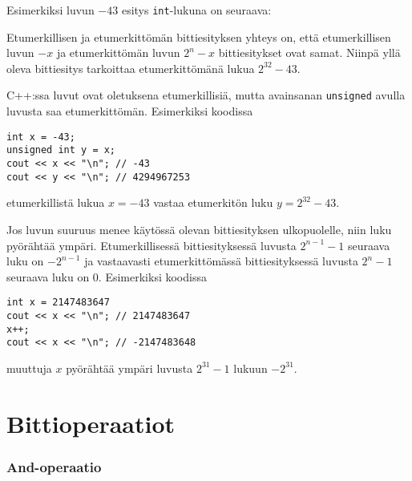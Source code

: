 Esimerkiksi luvun $-43$ esitys \texttt{int}-lukuna on seuraava:

\begin{center}
\end{center}

Etumerkillisen ja etumerkittömän bittiesityksen
yhteys on, että etumerkillisen luvun $-x$
ja etumerkittömän luvun $2^n-x$ bittiesitykset ovat samat.
Niinpä yllä oleva bittiesitys tarkoittaa
etumerkittömänä lukua $2^{32}-43$.

C++:ssa luvut ovat oletuksena etumerkillisiä,
mutta avainsanan \texttt{unsigned} avulla
luvusta saa etumerkittömän.
Esimerkiksi koodissa

\begin{lstlisting}
int x = -43;
unsigned int y = x;
cout << x << "\n"; // -43
cout << y << "\n"; // 4294967253
\end{lstlisting}

etumerkillistä lukua $x=-43$ vastaa etumerkitön luku $y=2^{32}-43$.

Jos luvun suuruus menee käytössä
olevan bittiesityksen ulkopuolelle,
niin luku pyörähtää ympäri.
Etumerkillisessä bittiesityksessä
luvusta $2^{n-1}-1$ seuraava luku on $-2^{n-1}$
ja vastaavasti etumerkittömässä bittiesityksessä
luvusta $2^n-1$ seuraava luku on $0$.
Esimerkiksi koodissa

\begin{lstlisting}
int x = 2147483647
cout << x << "\n"; // 2147483647
x++;
cout << x << "\n"; // -2147483648
\end{lstlisting}

muuttuja $x$ pyörähtää ympäri luvusta $2^{31}-1$ lukuun $-2^{31}$.

\section{Bittioperaatiot}

\newcommand\XOR{\mathbin{\char`\^}}

\subsubsection{And-operaatio}

